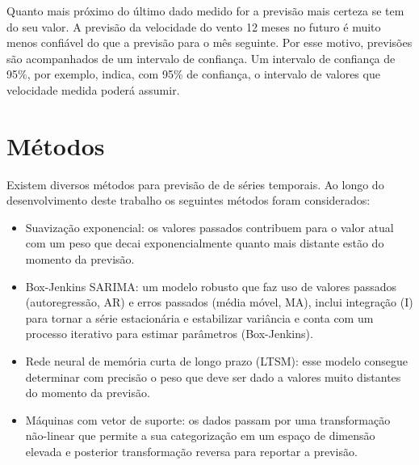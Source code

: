 \documentclass[
	12pt,				%
	openright,			%
	oneside,			%
	a4paper,			%
	english,			%
	french,				%
	spanish,			%
	brazil				%
	]{abntex2}
\begin{document}
Quanto mais próximo do último dado medido for a previsão mais certeza se tem do seu valor. A previsão da velocidade do vento 12 meses no futuro é muito menos confiável do que a previsão para o mês seguinte. Por esse motivo, previsões são acompanhados de um intervalo de confiança. Um intervalo de confiança de 95\%, por exemplo, indica, com 95\% de confiança, o intervalo de valores que velocidade medida poderá assumir.


\section{Métodos}

Existem diversos métodos para previsão de de séries temporais. Ao longo do desenvolvimento deste trabalho os seguintes métodos foram considerados: 
\begin{itemize}
\item Suavização exponencial: os valores passados contribuem para o valor atual com um peso que decai exponencialmente quanto mais distante estão do momento da previsão.
\item Box-Jenkins SARIMA: um modelo robusto que faz uso de valores passados (autoregressão, AR) e erros passados (média móvel, MA), inclui integração (I) para tornar a série estacionária e estabilizar variância e conta com um processo iterativo para estimar parâmetros (Box-Jenkins).
\item Rede neural de memória curta de longo prazo (LTSM): esse modelo consegue determinar com precisão o peso que deve ser dado a valores muito distantes do momento da previsão.
\item Máquinas com vetor de suporte: os dados passam por uma transformação não-linear que permite a sua categorização em um espaço de dimensão elevada e posterior transformação reversa para reportar a previsão.
\end{itemize}
\end{document}
